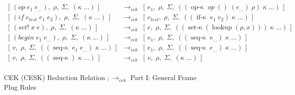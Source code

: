 \begin{figure}[!h]
{\begin{minipage}{\textwidth}
\begin{align*}
        [\,e_1,\;\rho_{op},\;\Sigma,\\
        &\; \hspace{1.5cm} \;((\operatorname{op-\kappa}\;op\;(v\;\ldots\;v_1)\;(e_{\ldots})\;\rho_{op})\;\kappa\;\ldots)\,]\\
%
        [\,(op\;e_1\;e_{\ldots}),\;\rho,\;\Sigma,\;(\kappa\;\ldots)\,]
        &\;\longrightarrow_{\textit{cek}}\;
        [\,e_1,\;\rho,\;\Sigma,\;((\operatorname{op-\kappa}\;op\;()\;(e_{\ldots})\;\rho)\;\kappa\;\ldots)\,]\\
%
        [\,(if\;e_{test}\;e_1\;e_2),\;\rho,\;\Sigma,\;(\kappa\;\ldots)\,]
        &\;\longrightarrow_{\textit{cek}}\;
        [\,e_{test},\;\rho,\;\Sigma,\;((\operatorname{if-\kappa}\;e_1\;e_2)\;\kappa\;\ldots)\,]\\
%
        [\,(set!\;x\;e),\;\rho,\;\Sigma,\;(\kappa\;\ldots)\,]
        &\;\longrightarrow_{\textit{cek}}\;
        [\,e,\;\rho,\;\Sigma,\;((\operatorname{set-\kappa}(\operatorname{lookup}(\rho,x)))\;\kappa\;\ldots)\,]\\
%
        [\,(begin\;e_1\;e_{\ldots}),\;\rho,\;\Sigma,\;(\kappa\;\ldots)\,]
        &\;\longrightarrow_{\textit{cek}}\;
        [\,e_1,\;\rho,\;\Sigma,\;((\operatorname{seq-\kappa}\;e_{\ldots})\;\kappa\;\ldots)\,]\\
%
        [\,v,\;\rho,\;\Sigma,\;((\operatorname{seq-\kappa}\;e_1\;e_{\ldots})\;\kappa\;\ldots)\,]
        &\;\longrightarrow_{\textit{cek}}\;
        [\,e_1,\;\rho,\;\Sigma,\;((\operatorname{seq-\kappa}\;e_{\ldots})\;\kappa\;\ldots)\,]\\
%
        [\,v,\;\rho,\;\Sigma,\;((\operatorname{seq-\kappa})\;\kappa\;\ldots)\,]
        &\;\longrightarrow_{\textit{cek}}\;
        [\,v,\;\rho,\;\Sigma,\;(\kappa\;\ldots)\,]\\
      \end{align*}
    \end{minipage}%
  }
  \vspace{0.6em}
  \caption{CEK (CESK) Reduction Relation $;\longrightarrow_{\textit{cek}}$ Part I: General Frame Plug Rules}
  \label{fig:cek-reduction-relation-redacted-general}
\end{figure}
